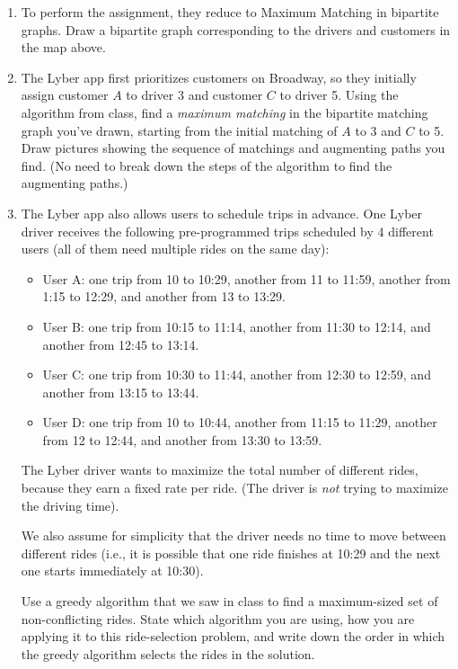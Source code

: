 \documentclass[11pt]{article}
\begin{document}
\begin{enumerate}
    \begin{enumerate}
    \item To perform the assignment, they reduce to Maximum Matching in bipartite graphs.  Draw a bipartite graph corresponding to the drivers and customers in the map above.

    
    \item The Lyber app first prioritizes customers on Broadway, so they initially assign customer $A$ to driver 3 and customer $C$ to driver 5. Using the algorithm from class, find a \textit{maximum matching} in the bipartite matching graph you've drawn, starting from the initial matching of $A$ to 3 and $C$ to 5. Draw pictures showing the sequence of matchings and augmenting paths you find. (No need to break down the steps of the algorithm to find the augmenting paths.)


    \item The Lyber app also allows users to schedule trips in advance. One Lyber driver receives the following pre-programmed trips scheduled by 4 different users (all of them need multiple rides on the same day):
    \begin{itemize}
        \item User A: one trip from 10 to 10:29, another from 11 to 11:59, another from 1:15 to 12:29, and another from 13 to 13:29.
        \item User B: one trip from 10:15 to 11:14, another from 11:30 to 12:14, and another from 12:45 to 13:14.
        \item User C: one trip from 10:30 to 11:44, another from 12:30 to 12:59, and another from 13:15 to 13:44.
        \item User D: one trip from 10 to 10:44, another from 11:15 to 11:29, another from 12 to 12:44, and another from 13:30 to 13:59.
    \end{itemize}
    The Lyber driver wants to maximize the total number of different rides, because they earn a fixed rate per ride. (The driver is \textit{not} trying to maximize the driving time). 

    We also assume for simplicity that the driver needs no time to move between different rides (i.e., it is possible that one ride finishes at 10:29 and the next one starts immediately at 10:30). 

    Use a greedy algorithm that we saw in class to find a maximum-sized set of non-conflicting rides.  State which algorithm you are using, how you are applying it to this ride-selection problem, and write down the order in which the greedy algorithm selects the rides in the solution. 


\end{enumerate}
\end{enumerate}
\end{document}
